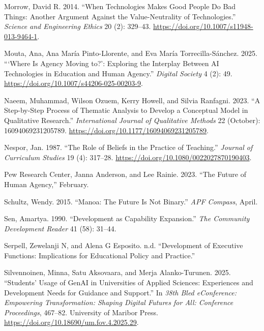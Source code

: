 \documentclass[
  letterpaper,
  DIV=11,
  numbers=noendperiod]{scrartcl}
\newlength{\cslhangindent}
\newenvironment{CSLReferences}[2] %
 {\begin{list}{}{%
  \setlength{\itemindent}{0pt}
  \setlength{\leftmargin}{0pt}
  \setlength{\parsep}{0pt}
  \ifodd #1
   \setlength{\leftmargin}{\cslhangindent}
   \setlength{\itemindent}{-1\cslhangindent}
  \fi
  \setlength{\itemsep}{#2\baselineskip}}}
 {\end{list}}
\begin{document}
\begin{CSLReferences}{1}{0}
Morrow, David R. 2014. {``When {Technologies Makes Good People Do Bad
Things}: {Another Argument Against} the {Value-Neutrality} of
{Technologies}.''} \emph{Science and Engineering Ethics} 20 (2):
329--43. \url{https://doi.org/10.1007/s11948-013-9464-1}.

Mouta, Ana, Ana María Pinto-Llorente, and Eva María Torrecilla-Sánchez.
2025. {``{`{Where} Is {Agency Moving} to?'}: {Exploring} the {Interplay}
Between {AI Technologies} in {Education} and {Human Agency}.''}
\emph{Digital Society} 4 (2): 49.
\url{https://doi.org/10.1007/s44206-025-00203-9}.

Naeem, Muhammad, Wilson Ozuem, Kerry Howell, and Silvia Ranfagni. 2023.
{``A {Step-by-Step Process} of {Thematic Analysis} to {Develop} a
{Conceptual Model} in {Qualitative Research}.''} \emph{International
Journal of Qualitative Methods} 22 (October): 16094069231205789.
\url{https://doi.org/10.1177/16094069231205789}.

Nespor, Jan. 1987. {``The Role of Beliefs in the Practice of
Teaching.''} \emph{Journal of Curriculum Studies} 19 (4): 317--28.
\url{https://doi.org/10.1080/0022027870190403}.

Pew Research Center, Janna Anderson, and Lee Rainie. 2023. {``The
{Future} of {Human Agency},''} February.

Schultz, Wendy. 2015. {``Manoa: {The} Future Is Not Binary.''} \emph{APF
Compass}, April.

Sen, Amartya. 1990. {``Development as Capability Expansion.''} \emph{The
Community Development Reader} 41 (58): 31--44.

Serpell, Zewelanji N, and Alena G Esposito. n.d. {``Development of
{Executive Functions}: {Implications} for {Educational Policy} and
{Practice}.''}

Silvennoinen, Minna, Satu Aksovaara, and Merja Alanko-Turunen. 2025.
{``Students' {Usage} of {GenAI} in {Universities} of {Applied Sciences}:
{Experiences} and {Development Needs} for {Guidance} and {Support}.''}
In \emph{38th {Bled eConference}: {Empowering Transformation}: {Shaping
Digital Futures} for {All}: {Conference Proceedings}}, 467--82.
University of Maribor Press.
\url{https://doi.org/10.18690/um.fov.4.2025.29}.


\end{CSLReferences}
\end{document}
